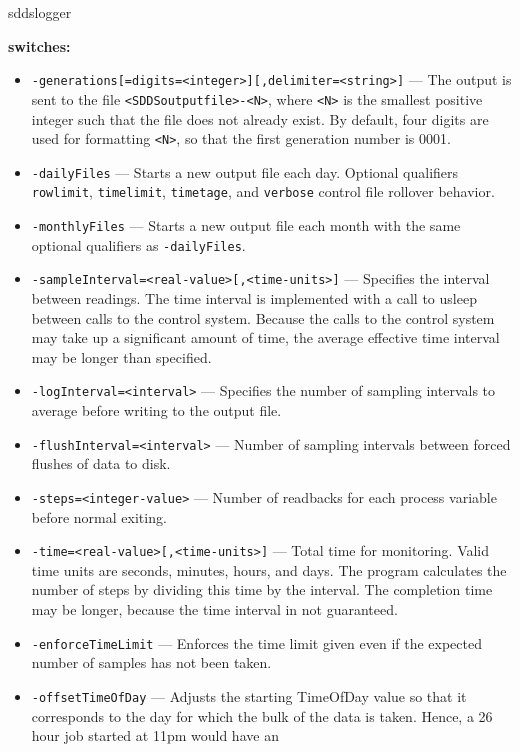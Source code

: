 \begin{sddsprog}{sddslogger}
\item \textbf{switches:}
\begin{itemize}
  \item {\verb+-generations[=digits=<integer>][,delimiter=<string>]+} ---
      The output is sent to the file \verb+<SDDSoutputfile>-<N>+, where \verb+<N>+ is
      the smallest positive integer such that the file does not already
      exist.  By default, four digits are used for formatting \verb+<N>+, so that
      the first generation number is 0001.
  \item {\tt -dailyFiles} --- Starts a new output file each day. Optional qualifiers
      \verb+rowlimit+, \verb+timelimit+, \verb+timetage+, and \verb+verbose+ control
      file rollover behavior.
  \item {\tt -monthlyFiles} --- Starts a new output file each month with the same optional
      qualifiers as \verb+-dailyFiles+.
  \item {\tt -sampleInterval=<real-value>[,<time-units>]} --- Specifies the interval between readings. The time
      interval is implemented with a call to usleep between calls to the control system.
      Because the calls to the control system may take up a significant amount of time, the average
      effective time interval may be longer than specified.
  \item {\tt -logInterval=<interval>} --- Specifies the number of sampling intervals to average before
      writing to the output file.
  \item {\tt -flushInterval=<interval>} --- Number of sampling intervals between forced flushes of data to disk.
  \item {\tt -steps=<integer-value>} --- Number of readbacks for each process variable before normal exiting.
  \item {\tt -time=<real-value>[,<time-units>]} --- Total time for monitoring. Valid time units are
      seconds, minutes, hours, and days. The program calculates the number of steps by dividing this time
      by the interval. The completion time may be longer, because the time interval in not guaranteed.
  \item {\tt -enforceTimeLimit} --- Enforces the time limit given even if the expected number of samples has
      not been taken.
  \item {\tt -offsetTimeOfDay} --- Adjusts the starting TimeOfDay value so that it corresponds to the
      day for which the bulk of the data is taken.  Hence, a 26 hour job started at 11pm would have an

\end{itemize}
\end{sddsprog}
